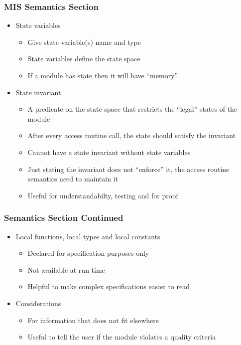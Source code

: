 \documentclass[t,12pt,numbers,fleqn]{beamer}
\begin{document}

\begin{frame}
\frametitle{MIS Semantics Section}

\begin{itemize}
\item State variables
\begin{itemize}
\item Give state variable(s) name and type
\item State variables define the state space
\item If a module has state then it will have ``memory''
\end{itemize}
\item State invariant
\begin{itemize}
\item A predicate on the state space that restricts the ``legal'' states of the module
\item After every access routine call, the state should satisfy the invariant
\item Cannot have a state invariant without state variables
\item Just stating the invariant does not ``enforce'' it, the access routine semantics need to maintain it
\item Useful for understandabilty, testing and for proof
\end{itemize}
\end{itemize}

\end{frame}


\begin{frame}
\frametitle{Semantics Section Continued}

\begin{itemize}
\item Local functions, local types and local constants
\begin{itemize}
\item Declared for specification purposes only
\item Not available at run time
\item Helpful to make complex specifications easier to read
\end{itemize}
\item Considerations
\begin{itemize}
\item For information that does not fit elsewhere
\item Useful to tell the user if the module violates a quality criteria
\end{itemize}
\end{itemize}

\end{frame}
\end{document}
